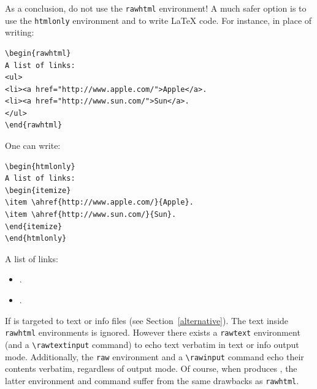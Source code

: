 As a conclusion, do not use the \texttt{rawhtml} environment!
A much safer option is to use the \texttt{htmlonly} environment
and to write \LaTeX{} code.
For instance, in place of writing:
\begin{verbatim}
\begin{rawhtml}
A list of links:
<ul>
<li><a href="http://www.apple.com/">Apple</a>.
<li><a href="http://www.sun.com/">Sun</a>.
</ul>
\end{rawhtml}
\end{verbatim}
One can write:
\begin{verbatim}
\begin{htmlonly}
A list of links:
\begin{itemize}
\item \ahref{http://www.apple.com/}{Apple}.
\item \ahref{http://www.sun.com/}{Sun}.
\end{itemize}
\end{htmlonly}
\end{verbatim}
\begin{htmlonly}
A list of links:
\begin{itemize}
\item {}.
\item {}.
\end{itemize}
\end{htmlonly}


If \hevea{} is targeted to text or info files (see
Section~\ref{alternative}).
The text inside \texttt{rawhtml} environments is ignored.
However there exists a \texttt{rawtext} environment (and a
\verb+\rawtextinput+ command) to echo text verbatim in text or info
output mode.
Additionally, the \texttt{raw} environment and a \verb+\rawinput+
command echo their contents verbatim, regardless of \hevea{} output
mode. Of course, when \hevea{} produces \html{},
the latter environment and command suffer from
the same drawbacks as \texttt{rawhtml}.

